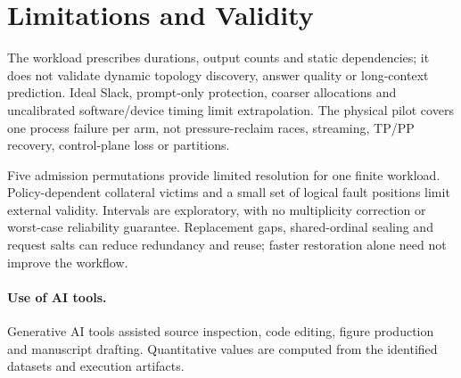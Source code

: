 \section{Limitations and Validity}
The workload prescribes durations, output counts and static dependencies;
it does not validate dynamic topology discovery, answer quality or long-context
prediction. Ideal Slack, prompt-only protection, coarser allocations and
uncalibrated software/device timing limit extrapolation. The physical pilot
covers one process failure per arm, not pressure-reclaim races, streaming,
TP/PP recovery, control-plane loss or partitions.

Five admission permutations provide limited resolution for one finite
workload. Policy-dependent collateral victims and a small set of logical
fault positions limit external validity. Intervals are exploratory, with no
multiplicity correction or worst-case reliability guarantee. Replacement
gaps, shared-ordinal sealing and request salts can reduce redundancy and
reuse; faster restoration alone need not improve the workflow.

\paragraph{Use of AI tools.}
Generative AI tools assisted source inspection, code editing, figure
production and manuscript drafting. Quantitative values are computed from
the identified datasets and execution artifacts.
